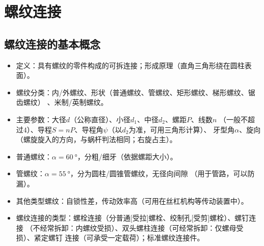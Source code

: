 \documentclass[12pt,a4paper]{article}
\newcommand{\tightlist}{\setlength{\parskip}{0pt}\setlength{\itemsep}{0pt}}
\newcommand{\hint}[1]{\textsf{（#1）}}
\newcommand{\minor}[1]{{\color{gray} #1}}
\begin{document}
\section{螺纹连接}

\subsection{螺纹连接的基本概念}
\begin{itemize}\tightlist
    \item 定义：具有螺纹的零件构成的可拆连接；形成原理\hint{直角三角形绕在圆柱表面}。
    \item 螺纹分类：内/外螺纹、形状\hint{普通螺纹、管螺纹、矩形螺纹、梯形螺纹、锯齿螺纹}
    \minor{、米制/英制螺纹}。
    \item 主要参数：大径$d$\hint{公称直径}、小径$d_1$、中径$d_2$、螺距$P$、线数$n$
    \hint{一般不超过$4$}、导程$S=nP$、导程角$\psi$\hint{以$d_2$为准，可用三角形计算}、
    牙型角$\alpha$、旋向\hint{螺旋旋入的方向，与蜗杆判法相同；右旋占主}。
    \item 普通螺纹：$\alpha=\SI{60}{\degree}$，分粗/细牙\hint{依据螺距大小}。
    \item \minor{管螺纹：$\alpha=\SI{55}{\degree}$，分为圆柱/圆锥管螺纹，无径向间隙
    \hint{用于管路，可以防漏}。}
    \item \minor{其他类型螺纹：自锁性差，传动效率高\hint{可用在丝杠机构等传动装置中}。}
    \item 螺纹连接的类型：螺栓连接\hint{分普通[受拉]螺栓、绞制孔[受剪]螺栓}、螺钉连接
    \hint{不经常拆卸：内螺纹受损}、双头螺柱连接\hint{可经常拆卸：仅螺母受损}、紧定螺钉
    连接\hint{可承受一定载荷}；标准螺纹连接件。
\end{itemize}
\end{document}
